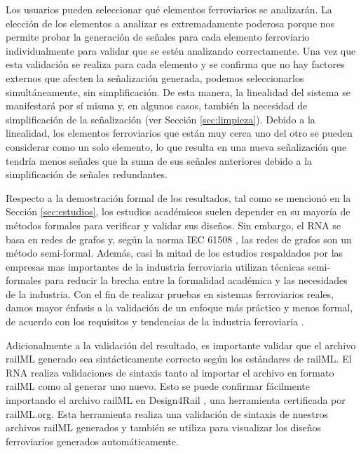     Los usuarios pueden seleccionar qué elementos ferroviarios se analizarán. La elección de los elementos a analizar es extremadamente poderosa porque nos permite probar la generación de señales para cada elemento ferroviario individualmente para validar que se estén analizando correctamente. Una vez que esta validación se realiza para cada elemento y se confirma que no hay factores externos que afecten la señalización generada, podemos seleccionarlos simultáneamente, sin simplificación. De esta manera, la linealidad del sistema se manifestará por sí misma y, en algunos casos, también la necesidad de simplificación de la señalización (ver Sección \ref{sec:limpieza}). Debido a la linealidad, los elementos ferroviarios que están muy cerca uno del otro se pueden considerar como un solo elemento, lo que resulta en una nueva señalización que tendría menos señales que la suma de sus señales anteriores debido a la simplificación de señales redundantes.

    Respecto a la demostración formal de los resultados, tal como se mencionó en la Sección \ref{sec:estudios}, los estudios académicos suelen depender en su mayoría de métodos formales para verificar y validar sus diseños. Sin embargo, el RNA se basa en redes de grafos y, según la norma IEC 61508 \cite{Paper_63,Paper_77,Paper_78,Paper_79,Paper_80,Paper_81,Paper_82,Paper_83}, las redes de grafos son un método semi-formal. Además, casi la mitad de los estudios respaldados por las empresas mas importantes de la industria ferroviaria utilizan técnicas semi-formales \cite{Paper_44,Paper_59,Paper_60,Paper_88,Paper_94,Paper_95,Paper_123,Paper_196,Paper_145,Paper_147,Paper_148,Paper_173} para reducir la brecha entre la formalidad académica y las necesidades de la industria. Con el fin de realizar pruebas en sistemas ferroviarios reales, damos mayor énfasis a la validación de un enfoque más práctico y menos formal, de acuerdo con los requisitos y tendencias de la industria ferroviaria \cite{Paper_51,Paper_52,Paper_57,Paper_58,Paper_61,Paper_67,Paper_70,Paper_71,Paper_72,Paper_73,Paper_74,Paper_75,Paper_76,Paper_77,Paper_84,Paper_129,Paper_134,Paper_152,Paper_166,Paper_167}.
    
    Adicionalmente a la validación del resultado, es importante validar que el archivo railML generado sea sintácticamente correcto según los estándares de railML. El RNA realiza validaciones de sintaxis tanto al importar el archivo en formato railML como al generar uno nuevo. Esto se puede confirmar fácilmente importando el archivo railML en Design4Rail \cite{DESIGN4RAIL}, una herramienta certificada por railML.org. Esta herramienta realiza una validación de sintaxis de nuestros archivos railML generados y también se utiliza para visualizar los diseños ferroviarios generados automáticamente.

